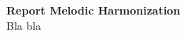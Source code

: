 \begin{titlepage}
		\raggedleft\textbf{\Huge Report Melodic Harmonization}\\
		\vspace{\fill}
		\centering Bla bla
\end{titlepage}